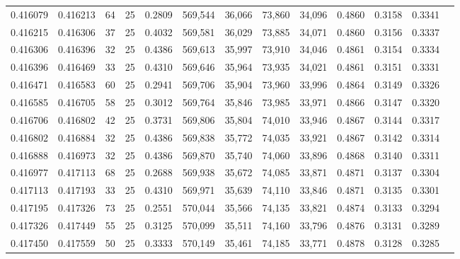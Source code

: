 \begin{tabular}{rrrrrrrrrrrrr}
0.416079 & 0.416213 &    64 &  25 &                                     0.2809 & 569,544 &  36,066 &  73,860 &  34,096 & 0.4860 & 0.3158 & 0.3341 \\
0.416215 & 0.416306 &    37 &  25 &                                     0.4032 & 569,581 &  36,029 &  73,885 &  34,071 & 0.4860 & 0.3156 & 0.3337 \\
0.416306 & 0.416396 &    32 &  25 &                                     0.4386 & 569,613 &  35,997 &  73,910 &  34,046 & 0.4861 & 0.3154 & 0.3334 \\
0.416396 & 0.416469 &    33 &  25 &                                     0.4310 & 569,646 &  35,964 &  73,935 &  34,021 & 0.4861 & 0.3151 & 0.3331 \\
0.416471 & 0.416583 &    60 &  25 &                                     0.2941 & 569,706 &  35,904 &  73,960 &  33,996 & 0.4864 & 0.3149 & 0.3326 \\
0.416585 & 0.416705 &    58 &  25 &                                     0.3012 & 569,764 &  35,846 &  73,985 &  33,971 & 0.4866 & 0.3147 & 0.3320 \\
0.416706 & 0.416802 &    42 &  25 &                                     0.3731 & 569,806 &  35,804 &  74,010 &  33,946 & 0.4867 & 0.3144 & 0.3317 \\
0.416802 & 0.416884 &    32 &  25 &                                     0.4386 & 569,838 &  35,772 &  74,035 &  33,921 & 0.4867 & 0.3142 & 0.3314 \\
0.416888 & 0.416973 &    32 &  25 &                                     0.4386 & 569,870 &  35,740 &  74,060 &  33,896 & 0.4868 & 0.3140 & 0.3311 \\
0.416977 & 0.417113 &    68 &  25 &                                     0.2688 & 569,938 &  35,672 &  74,085 &  33,871 & 0.4871 & 0.3137 & 0.3304 \\
0.417113 & 0.417193 &    33 &  25 &                                     0.4310 & 569,971 &  35,639 &  74,110 &  33,846 & 0.4871 & 0.3135 & 0.3301 \\
0.417195 & 0.417326 &    73 &  25 &                                     0.2551 & 570,044 &  35,566 &  74,135 &  33,821 & 0.4874 & 0.3133 & 0.3294 \\
0.417326 & 0.417449 &    55 &  25 &                                     0.3125 & 570,099 &  35,511 &  74,160 &  33,796 & 0.4876 & 0.3131 & 0.3289 \\
0.417450 & 0.417559 &    50 &  25 &                                     0.3333 & 570,149 &  35,461 &  74,185 &  33,771 & 0.4878 & 0.3128 & 0.3285 \\

\end{tabular}
